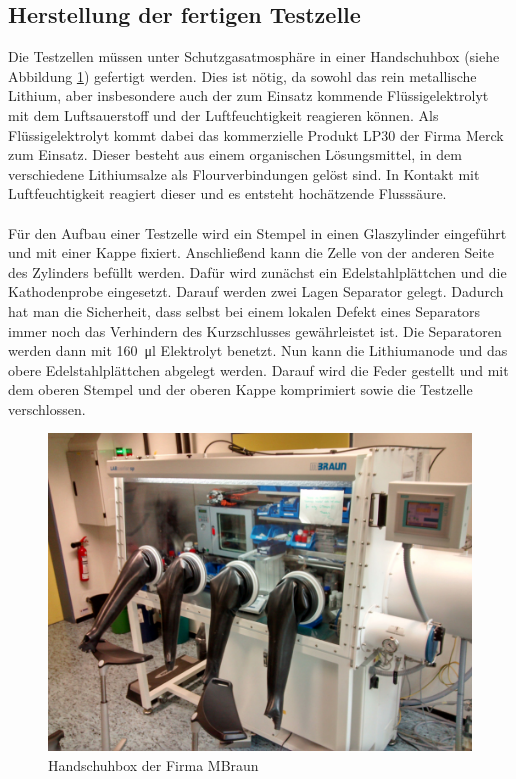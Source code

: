 \documentclass[a4paper, 11pt, headsepline,footsepline,twoside,abstract]{scrbook}
\begin{document}
\subsection{Herstellung der fertigen Testzelle}
Die Testzellen müssen unter Schutzgasatmosphäre in einer Handschuhbox (siehe Abbildung \ref{handschuhbox}) gefertigt werden. Dies ist nötig, da sowohl das rein metallische Lithium, aber insbesondere auch der zum Einsatz kommende Flüssigelektrolyt mit dem Luftsauerstoff und der Luftfeuchtigkeit reagieren können. Als Flüssigelektrolyt kommt dabei das kommerzielle Produkt LP30 der Firma Merck zum Einsatz. Dieser besteht aus einem organischen Lösungsmittel, in dem verschiedene Lithiumsalze als Flourverbindungen gelöst sind. In Kontakt mit Luftfeuchtigkeit reagiert dieser und es entsteht hochätzende Flusssäure. 
\\\\
Für den Aufbau einer Testzelle wird ein Stempel in einen Glaszylinder eingeführt und mit einer Kappe fixiert. Anschließend kann die Zelle von der anderen Seite des Zylinders befüllt werden. Dafür wird zunächst ein Edelstahlplättchen und die Kathodenprobe eingesetzt. Darauf werden zwei Lagen Separator gelegt. Dadurch hat man die Sicherheit, dass selbst bei einem lokalen Defekt eines Separators immer noch das Verhindern des Kurzschlusses gewährleistet ist. Die Separatoren werden dann mit \SI{160}{\micro\litre} Elektrolyt benetzt. Nun kann die Lithiumanode und das obere Edelstahlplättchen abgelegt werden. Darauf wird die Feder gestellt und mit dem oberen Stempel und der oberen Kappe komprimiert sowie die Testzelle verschlossen.
\begin{figure}[h]
	\centering
	\includegraphics[width=1.0\columnwidth]{images/handschuhbox.jpg}
	\caption{Handschuhbox der Firma MBraun}
	\label{handschuhbox}
\end{figure}
\end{document}
